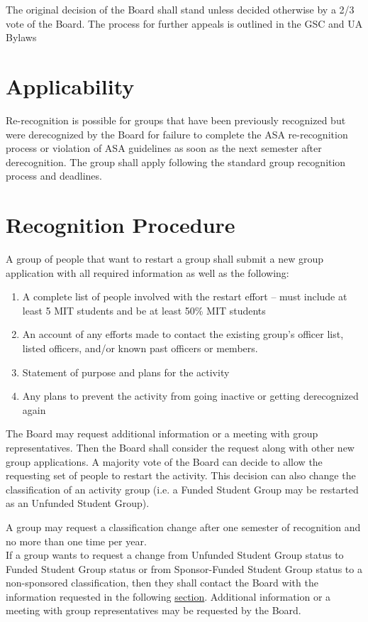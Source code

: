 \documentclass[12pt]{article}
\begin{document}
The original decision of the Board shall stand unless decided otherwise by a 2/3 vote of the Board. The
process for further appeals is outlined in the GSC and UA Bylaws



\section{Applicability}
Re-recognition is possible for groups that have been previously recognized but were derecognized by the
Board for failure to complete the ASA re-recognition process or violation of ASA guidelines as soon as the
next semester after derecognition. The group shall apply following the standard group recognition
process and deadlines.

\section{Recognition Procedure}
A group of people that want to restart a group shall submit a new group application with all required
information as well as the following:
\begin{enumerate}
    \item A complete list of people involved with the restart effort – must include at least 5 MIT
students and be at least 50\% MIT students
    \item An account of any efforts made to contact the existing group’s officer list, listed officers,
and/or known past officers or members.
    \item Statement of purpose and plans for the activity
    \item Any plans to prevent the activity from going inactive or getting derecognized again
\end{enumerate}
The Board may request additional information or a meeting with group representatives. Then the
Board shall consider the request along with other new group applications. A majority vote of the
Board can decide to allow the requesting set of people to restart the activity. This decision can also
change the classification of an activity group (i.e. a Funded Student Group may be restarted as an
Unfunded Student Group).


A group may request a classification change after one semester of recognition and no more than one
time per year.
\\

If a group wants to request a change from Unfunded Student Group status to Funded Student Group
status or from Sponsor-Funded Student Group status to a non-sponsored classification, then they shall
contact the Board with the information requested in the following \hyperref[app:B_artVI_sect1]{section}. Additional information or a
meeting with group representatives may be requested by the Board.
\\
\end{document}
